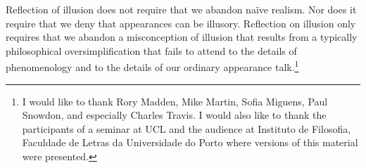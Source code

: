 \documentclass[12pt]{article}
\begin{document}
Reflection of illusion does not require that we abandon naïve realism. Nor does it require that we deny that appearances can be illusory. Reflection on illusion only requires that we abandon a misconception of illusion that results from a typically philosophical oversimplification that fails to attend to the details of phenomenology and to the details of our ordinary appearance talk.\footnote{I would like to thank Rory Madden, Mike Martin, Sofia Miguens, Paul Snowdon, and especially Charles Travis. I would also like to thank the participants of a seminar at UCL and the audience at Instituto de Filosofia, Faculdade de Letras da Universidade do Porto where versions of this material were presented.}



 
 
\end{document}

